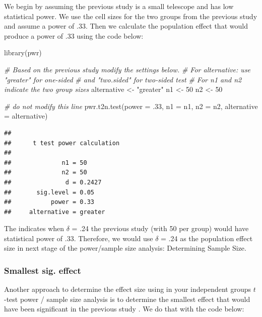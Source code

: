 \documentclass[
]{krantz}
\makeatletter
\newenvironment{Shaded}{\begin{snugshade}}{\end{snugshade}}
\newcommand{\AttributeTok}[1]{\textcolor[rgb]{0.61,0.61,0.61}{#1}}
\newcommand{\CommentTok}[1]{\textcolor[rgb]{0.37,0.37,0.37}{\textit{#1}}}
\newcommand{\DecValTok}[1]{\textcolor[rgb]{0.06,0.06,0.06}{#1}}
\newcommand{\FunctionTok}[1]{\textcolor[rgb]{0,0,0}{#1}}
\newcommand{\NormalTok}[1]{#1}
\newcommand{\OtherTok}[1]{\textcolor[rgb]{0.37,0.37,0.37}{#1}}
\newcommand{\StringTok}[1]{\textcolor[rgb]{0.5,0.5,0.5}{#1}}
\newenvironment{kframe}{%
\medskip{}
\setlength{\fboxsep}{.8em}
 \def\at@end@of@kframe{}%
 \ifinner\ifhmode%
  \def\at@end@of@kframe{\end{minipage}}%
  \begin{minipage}{\columnwidth}%
 \fi\fi%
 \def\FrameCommand##1{\hskip\@totalleftmargin \hskip-\fboxsep
 \colorbox{shadecolor}{##1}\hskip-\fboxsep
     \hskip-\linewidth \hskip-\@totalleftmargin \hskip\columnwidth}%
 \MakeFramed {\advance\hsize-\width
   \@totalleftmargin\z@ \linewidth\hsize
   \@setminipage}}%
 {\par\unskip\endMakeFramed%
 \at@end@of@kframe}
\renewenvironment{Shaded}{\begin{kframe}}{\end{kframe}}
\makeatother
\begin{document}
We begin by assuming the previous study is a small telescope and has low statistical power. We use the cell sizes for the two groups from the previous study and assume a power of .33. Then we calculate the population effect that would produce a power of .33 using the code below:

\begin{Shaded}
\begin{Highlighting}[]
\FunctionTok{library}\NormalTok{(pwr)}

\CommentTok{\# Based on the previous study modify the settings below.}
\CommentTok{\# For alternative: use "greater" for one{-}sided }
\CommentTok{\# and "two.sided" for two{-}sided test}
\CommentTok{\# For n1 and n2 indicate the two group sizes}
\NormalTok{alternative }\OtherTok{\textless{}{-}} \StringTok{"greater"}
\NormalTok{n1 }\OtherTok{\textless{}{-}} \DecValTok{50}
\NormalTok{n2 }\OtherTok{\textless{}{-}} \DecValTok{50}

\CommentTok{\# do not modify this line}
\FunctionTok{pwr.t2n.test}\NormalTok{(}\AttributeTok{power =}\NormalTok{ .}\DecValTok{33}\NormalTok{,}
             \AttributeTok{n1 =}\NormalTok{ n1, }
             \AttributeTok{n2 =}\NormalTok{ n2, }
             \AttributeTok{alternative =}\NormalTok{ alternative)}
\end{Highlighting}
\end{Shaded}

\begin{verbatim}
## 
##      t test power calculation 
## 
##              n1 = 50
##              n2 = 50
##               d = 0.2427
##       sig.level = 0.05
##           power = 0.33
##     alternative = greater
\end{verbatim}

The indicates when \(\delta\) = .24 the previous study (with 50 per group) would have statistical power of .33. Therefore, we would use \(\delta\) = .24 as the population effect size in next stage of the power/sample size analysis: Determining Sample Size.

\hypertarget{smallest-sig.-effect}{%
\subsubsection{Smallest sig. effect}\label{smallest-sig.-effect}}

Another approach to determine the effect size using in your independent groups \(t\)-test power / sample size analysis is to determine the smallest effect that would have been significant in the previous study \citep{lakens2018equivalence}. We do that with the code below:
\end{document}
